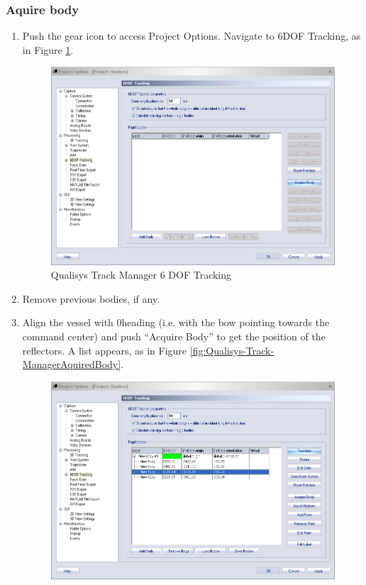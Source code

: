 \documentclass[a4paper,english]{report}
\begin{document}
\subsubsection*{Aquire body}
\begin{enumerate}
	\item Push the gear icon to access Project Options. Navigate to 6DOF Tracking,
	as in Figure \ref{fig:Qualisys-Track-Manager6DOF}.
	\begin{figure}[!h]
		\centering \includegraphics[width=1\textwidth]{fig/qualisys_6dof} \caption{\label{fig:Qualisys-Track-Manager6DOF}Qualisys Track Manager 6 DOF
			Tracking}
	\end{figure}
	\item Remove previous bodies, if any.
	\item Align the vessel with 0\degree heading (i.e. with the bow pointing towards the command center) and push ``Acquire Body'' to get the position of the reflectors. A list appears, as in Figure \ref{fig:Qualisys-Track-ManagerAquiredBody}. 
	\begin{figure}[!h]
		\centering \includegraphics[width=1\textwidth]{fig/qualisys_orientating}

\end{figure}
\end{enumerate}
\end{document}
